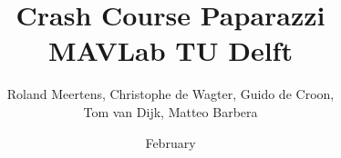 \documentclass{report}
\begin{document}
\author{Roland Meertens, Christophe de Wagter, Guido de Croon,\\Tom van Dijk, Matteo Barbera}
\title{\bf Crash Course Paparazzi \the\year\\MAVLab TU Delft}
\date{February \the\year}
\maketitle

\tableofcontents

\setlength{\parindent}{0em}





	
\end{document}
